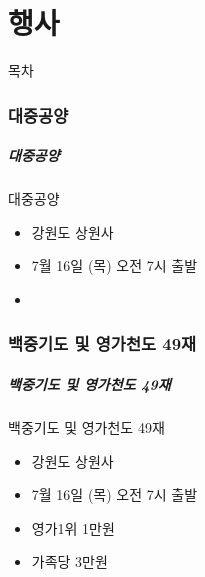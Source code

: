 \documentclass[aspectratio=1610,14pt,xcolor=pdftex,dvipsnames,table,handout]{beamer}
\begin{document}
		


		\part{행사}
		\frame{\partpage}
		
		\begin{frame} [plain]{목차}
		\tableofcontents%
		\end{frame}
		

	

	

		\section{대중공양}
		\begin{frame} [t,plain]
		\frametitle{대중공양}
			\begin{block} {대중공양 }
			\setlength{\leftmargini}{5em}			
			\begin{itemize}
				\item [장소]	 강원도 상원사
				\item [일시]	7월 16일 (목) 오전 7시 출발
				\item [금액]	
			\end{itemize}
			\end{block}						
		\end{frame}					

		\section{백중기도 및 영가천도 49재}
		\begin{frame} [t,plain]
		\frametitle{백중기도 및 영가천도 49재 }
			\begin{block} {백중기도 및 영가천도 49재 }

			\setlength{\leftmargini}{5em}			
			\begin{itemize}
				\item [입재]	 강원도 상원사
				\item [회향]	7월 16일 (목) 오전 7시 출발
				\item [망축기도]	영가1위 1만원
				\item [생축기도]	가족당 3만원
			\end{itemize}

			\end{block}						
		\end{frame}					
\end{document}
